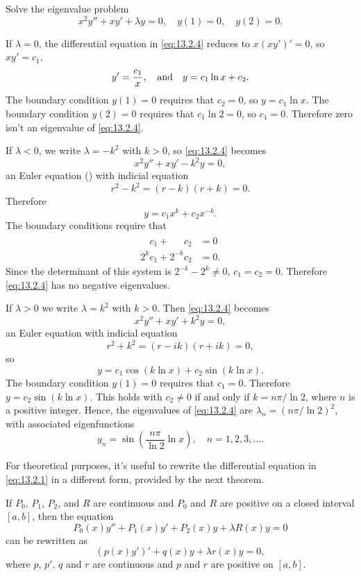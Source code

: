\begin{example} \label{example:13.2.2}
Solve the eigenvalue
problem
\begin{equation} \label{eq:13.2.4}
x^{2}y''+xy'+\lambda y=0,\quad y(1)=0,\quad y(2)=0.
\end{equation}
\end{example}

\begin{solution}
If  $\lambda=0$,  the differential equation in \eqref{eq:13.2.4}  reduces to
$x(xy')'=0$, so $xy'=c_{1}$,
\[
y'=\frac{c_{1}}{x}, \text{\quad and\quad}  y=c_{1}\ln x+c_{2}.
\]
The boundary condition $y(1)=0$ requires that $c_{2}=0$, so $y=c_{1}\ln x$.
The boundary condition  $y(2)=0$ requires that $c_{1}\ln2=0$, so $c_{1}=0$.
Therefore zero isn't  an eigenvalue of \eqref{eq:13.2.4}.

 If $\lambda<0$, we
write $\lambda=-k^{2}$ with $k>0$, so \eqref{eq:13.2.4} becomes
\[
x^{2}y''+xy'-k^{2}y=0,
\]
an Euler equation () with indicial equation
\[
r^{2}-k^{2}=(r-k)(r+k)=0.
\]
Therefore
\[
y=c_{1}x^{k}+c_{2}x^{-k}.
\]
The boundary conditions require that
\begin{align*}
\phantom{2^{k}}c_{1}+\phantom{2^{-k}}c_{2}&=0 \\
2^{k}c_{1}+2^{-k}c_{2}&=0.
\end{align*}
Since the determinant of this system  is $2^{-k}-2^{k}\ne0$,
$c_{1}=c_{2}=0$. Therefore \eqref{eq:13.2.4} has no negative eigenvalues.

If $\lambda>0$ we write $\lambda=k^{2}$ with $k>0$. Then  \eqref{eq:13.2.4}
becomes
\[
x^{2}y''+xy' +k^{2}y=0,
\]
an Euler equation with indicial equation
\[
r^{2}+k^{2}=(r-ik)(r+ik)=0,
\]
so
\[
y=c_{1}\cos(k\ln x)+c_{2}\sin(k\ln x).
\]
 The boundary condition $y(1)=0$
requires that $c_{1}=0$. Therefore $y=c_{2}\sin(k\ln x)$. This holds with
$c_{2}\ne0$ if and only if $k=n\pi/\ln 2$, where $n$ is a positive integer.
Hence, the eigenvalues of \eqref{eq:13.2.4} are $\lambda_{n}=(n\pi/\ln2)^{2}$,
with associated eigenfunctions
\[
y_{n}=\sin\left(\frac{n\pi}{\ln2}\ln x\right),\quad n=1,2,3,\dots.
\]
\end{solution}

For theoretical purposes, it's useful to rewrite the differential equation
in \eqref{eq:13.2.1} in a different form, provided by the next theorem.

\begin{theorem}\label{thmtype:13.2.1}
If $P_{0}$, $P_{1}$, $P_{2}$, and $R$ are continuous and $P_{0}$ and $R$
are positive on a closed interval $[a,b]$, then the equation
\begin{equation} \label{eq:13.2.5}
P_{0}(x)y''+P_{1}(x)y'+P_{2}(x)y+\lambda R(x)y=0
\end{equation}
can be rewritten as
\begin{equation} \label{eq:13.2.6}
(p(x)y')'+q(x)y+\lambda r(x)y=0,
\end{equation}
where $p$, $p'$, $q$ and $r$ are continuous and $p$ and $r$ are positive
on $[a,b]$.
\end{theorem}

